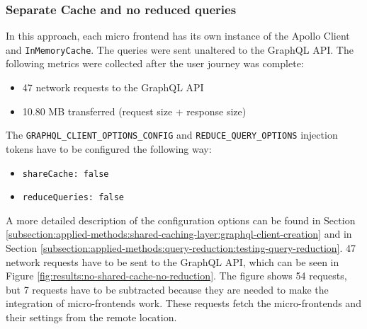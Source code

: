 \subsubsection{Separate Cache and no reduced queries}\label{subsubsection:results:performance-measurement:separate-cache-no-reduction}

In this approach, each micro frontend has its own instance of the Apollo Client and \texttt{InMemoryCache}. The queries were sent unaltered to the GraphQL \ac{API}. The following metrics were collected after the user journey was complete:

\begin{itemize}
  \item 47 network requests to the GraphQL \ac{API}
  \item 10.80 MB transferred (request size + response size)
\end{itemize}

\noindent The \texttt{GRAPHQL\_CLIENT\_OPTIONS\_CONFIG} and \texttt{REDUCE\_QUERY\_OPTIONS} injection tokens have to be configured the following way:

\begin{itemize}
  \item \texttt{shareCache: false}
  \item \texttt{reduceQueries: false}
\end{itemize}

\noindent A more detailed description of the configuration options can be found in Section \ref{subsection:applied-methods:shared-caching-layer:graphql-client-creation} and in Section \ref{subsection:applied-methods:query-reduction:testing-query-reduction}. 47 network requests have to be sent to the GraphQL \ac{API}, which can be seen in Figure \ref{fig:results:no-shared-cache-no-reduction}. The figure shows 54 requests, but 7 requests have to be subtracted because they are needed to make the integration of micro-frontends work. These requests fetch the micro-frontends and their settings from the remote location.

